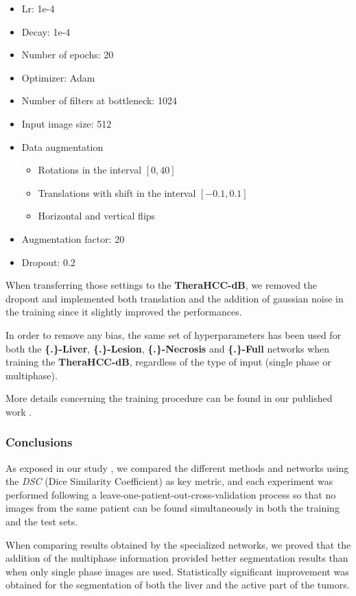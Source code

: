 \documentclass[]{article}
\newcommand{\pplfont}[1]{{\textbf{\fontfamily{ppl}\selectfont #1}}}
\newcommand{\lmttfont}[1]{{\fontfamily{lmtt}\selectfont #1}}
\begin{document}
	\begin{itemize}
		\item Lr: 1e-4
		\item Decay: 1e-4
		\item Number of epochs: 20
		\item Optimizer: Adam
		\item Number of filters at bottleneck: 1024
		\item Input image size: 512
		\item Data augmentation
		\begin{itemize}
			\item Rotations in the interval $ \left[0, 40\right] $
			\item Translations with shift in the interval $ \left[-0.1, 0.1\right] $
			\item Horizontal and vertical flips
		\end{itemize}
		\item Augmentation factor: 20
		\item Dropout: 0.2
	\end{itemize}
	
	When transferring those settings to the \textbf{\lmttfont{TheraHCC-dB}}, we removed the
	dropout and implemented both translation and the addition of gaussian
	noise in the training since it slightly improved the performances.
	
	In order to remove any bias, the same set of hyperparameters has been
	used for both the \pplfont{\{.\}-Liver}, \pplfont{\{.\}-Lesion}, \pplfont{\{.\}-Necrosis} and
	\pplfont{\{.\}-Full} networks when training the \textbf{\lmttfont{TheraHCC-dB}}, regardless of the
	type of input (single phase or multiphase).
	
	More details concerning the training procedure can be found in our
	published work \cite{Ouhmich2019}.
	
	\subsubsection*{Conclusions}
	
	As exposed in our study \cite{Ouhmich2019}, we compared the
	different methods and networks using the \emph{DSC} (Dice Similarity
	Coefficient) as key metric, and each experiment was performed following
	a leave-one-patient-out-cross-validation process so that no images from
	the same patient can be found simultaneously in both the training and
	the test sets.
	
	When comparing results obtained by the specialized networks, we proved
	that the addition of the multiphase information provided better
	segmentation results than when only single phase images are used.
	Statistically significant improvement was obtained for the segmentation
	of both the liver and the active part of the tumors.
	
\end{document}
